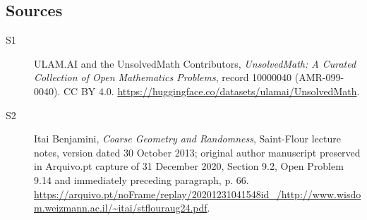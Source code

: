\documentclass[11pt]{article}
\begin{document}
\subsection{Sources}
\begin{description}
\item[\hypertarget{source:10000040:1}{S1}] ULAM.AI and the UnsolvedMath Contributors, \emph{UnsolvedMath: A Curated Collection of Open Mathematics Problems}, record 10000040 (AMR-099-0040). CC BY 4.0. \url{https://huggingface.co/datasets/ulamai/UnsolvedMath}.
\item[\hypertarget{source:10000040:2}{S2}] Itai Benjamini, \emph{Coarse Geometry and Randomness}, Saint-Flour lecture notes, version dated 30 October 2013; original author manuscript preserved in Arquivo.pt capture of 31 December 2020, Section 9.2, Open Problem 9.14 and immediately preceding paragraph, p. 66. \url{https://arquivo.pt/noFrame/replay/20201231041548id_/http://www.wisdom.weizmann.ac.il/~itai/stflouraug24.pdf}.
\end{description}
\label{end:10000040}
\end{document}
